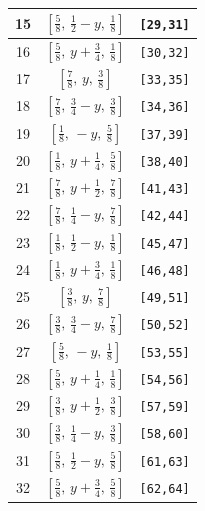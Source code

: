 \documentclass[fleqn,8pt]{jsarticle}
\begin{document}
\begin{longtable}{ccc}
15 & $\left[ \frac{5}{8},\, \frac{1}{2} - y,\, \frac{1}{8} \right]$ & {\tt [29,31]} \\ \hline
16 & $\left[ \frac{5}{8},\, y + \frac{3}{4},\, \frac{1}{8} \right]$ & {\tt [30,32]} \\ \hline
17 & $\left[ \frac{7}{8},\, y,\, \frac{3}{8} \right]$ & {\tt [33,35]} \\ \hline
18 & $\left[ \frac{7}{8},\, \frac{3}{4} - y,\, \frac{3}{8} \right]$ & {\tt [34,36]} \\ \hline
19 & $\left[ \frac{1}{8},\, - y,\, \frac{5}{8} \right]$ & {\tt [37,39]} \\ \hline
20 & $\left[ \frac{1}{8},\, y + \frac{1}{4},\, \frac{5}{8} \right]$ & {\tt [38,40]} \\ \hline
21 & $\left[ \frac{7}{8},\, y + \frac{1}{2},\, \frac{7}{8} \right]$ & {\tt [41,43]} \\ \hline
22 & $\left[ \frac{7}{8},\, \frac{1}{4} - y,\, \frac{7}{8} \right]$ & {\tt [42,44]} \\ \hline
23 & $\left[ \frac{1}{8},\, \frac{1}{2} - y,\, \frac{1}{8} \right]$ & {\tt [45,47]} \\ \hline
24 & $\left[ \frac{1}{8},\, y + \frac{3}{4},\, \frac{1}{8} \right]$ & {\tt [46,48]} \\ \hline
25 & $\left[ \frac{3}{8},\, y,\, \frac{7}{8} \right]$ & {\tt [49,51]} \\ \hline
26 & $\left[ \frac{3}{8},\, \frac{3}{4} - y,\, \frac{7}{8} \right]$ & {\tt [50,52]} \\ \hline
27 & $\left[ \frac{5}{8},\, - y,\, \frac{1}{8} \right]$ & {\tt [53,55]} \\ \hline
28 & $\left[ \frac{5}{8},\, y + \frac{1}{4},\, \frac{1}{8} \right]$ & {\tt [54,56]} \\ \hline
29 & $\left[ \frac{3}{8},\, y + \frac{1}{2},\, \frac{3}{8} \right]$ & {\tt [57,59]} \\ \hline
30 & $\left[ \frac{3}{8},\, \frac{1}{4} - y,\, \frac{3}{8} \right]$ & {\tt [58,60]} \\ \hline
31 & $\left[ \frac{5}{8},\, \frac{1}{2} - y,\, \frac{5}{8} \right]$ & {\tt [61,63]} \\ \hline
32 & $\left[ \frac{5}{8},\, y + \frac{3}{4},\, \frac{5}{8} \right]$ & {\tt [62,64]} \\
\end{longtable}
\renewcommand{\arraystretch}{1.2}
\end{document}
